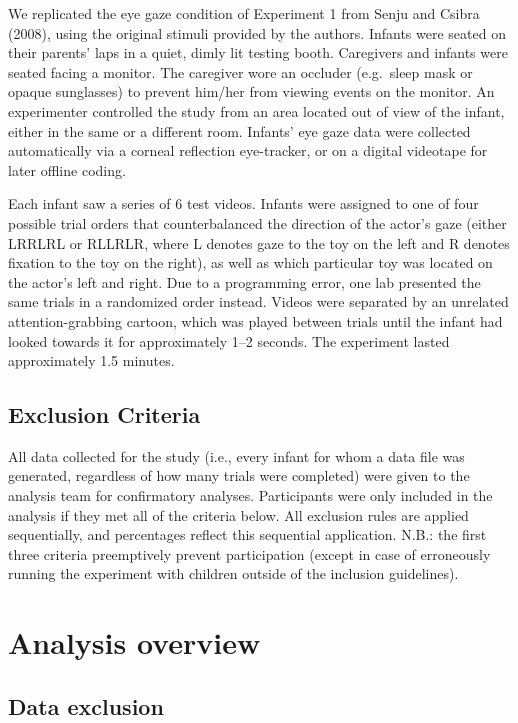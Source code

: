 \documentclass[,man,floatsintext]{apa6}
\begin{document}
We replicated the eye gaze condition of Experiment 1 from Senju and Csibra (2008), using the original stimuli provided by the authors. Infants were seated on their parents' laps in a quiet, dimly lit testing booth. Caregivers and infants were seated facing a monitor. The caregiver wore an occluder (e.g.~sleep mask or opaque sunglasses) to prevent him/her from viewing events on the monitor. An experimenter controlled the study from an area located out of view of the infant, either in the same or a different room. Infants' eye gaze data were collected automatically via a corneal reflection eye-tracker, or on a digital videotape for later offline coding.

Each infant saw a series of 6 test videos. Infants were assigned to one of four possible trial orders that counterbalanced the direction of the actor's gaze (either LRRLRL or RLLRLR, where L denotes gaze to the toy on the left and R denotes fixation to the toy on the right), as well as which particular toy was located on the actor's left and right. Due to a programming error, one lab presented the same trials in a randomized order instead. Videos were separated by an unrelated attention-grabbing cartoon, which was played between trials until the infant had looked towards it for approximately 1--2 seconds. The experiment lasted approximately 1.5 minutes.

\hypertarget{exclusion-criteria}{%
\subsection{Exclusion Criteria}\label{exclusion-criteria}}

All data collected for the study (i.e., every infant for whom a data file was generated, regardless of how many trials were completed) were given to the analysis team for confirmatory analyses. Participants were only included in the analysis if they met all of the criteria below. All exclusion rules are applied sequentially, and percentages reflect this sequential application. N.B.: the first three criteria preemptively prevent participation (except in case of erroneously running the experiment with children outside of the inclusion guidelines).

\hypertarget{analysis-overview}{%
\section{Analysis overview}\label{analysis-overview}}

\hypertarget{data-exclusion}{%
\subsection{Data exclusion}\label{data-exclusion}}
\end{document}
